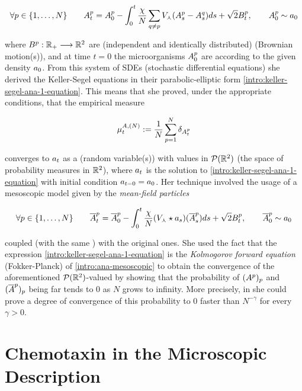 \begin{equation}
		\forall p \in \{1, \ldots, N\}
		\qquad 
		A_t^p = A_0^p - \int_0^t \frac{\chi}{N} \sum_{q\neq p} V_\curlywedge (A_s^p - A_s^q) ds + \sqrt{2} B_t^p,
		\qquad
		A_0^p \sim a_0
\end{equation}

where $B^p: \mathbb{R}_+ \longrightarrow \mathbb{R}^2$ are \iid (independent and identically distributed) \Bm (Brownian motion(s)), and at time $t=0$ the microorganisms $A_0^p$ are \iid according to the given density $a_0$.
From this system of SDEs (stochastic differential equations) she derived the Keller-Segel equations in their parabolic-elliptic form \ref{intro:keller-segel-ana-1-equation}.
This means that she proved, under the appropriate conditions, that the empirical measure

\begin{equation*}
	\mu_t^{A,(N)}:= \frac{1}{N}\sum_{p=1}^N \delta_{A_t^p}
\end{equation*}

converges to $a_t$ as a \rv (random variable(s)) with values in $\mathcal{P}(\mathbb{R}^2)$ (the space of probability measures in $\mathbb{R}^2$), where $a_t$ is the solution to \ref{intro:keller-segel-ana-1-equation} with initial condition $a_{t=0} = a_0$.
Her technique involved the usage of a mesoscopic model given by the \iid \emph{mean-field particles}

\begin{equation}\label{intro:ana-mesoscopic}
	\forall p \in \{1, \ldots, N\}
	\qquad
	\overline{A}_t^p = \overline{A}_0^p - \int_0^t \frac{\chi}{N} (V_\curlywedge \star a_s )(\overline{A}_s^p) ds + \sqrt{2} B_t^p,
	\qquad
	\overline{A}_0^p \sim a_0
\end{equation}

coupled (\ie with the same \Bm) with the original ones.
She used the fact that the expression \ref{intro:keller-segel-ana-1-equation} is the \emph{Kolmogorov forward equation} (Fokker-Planck) of \ref{intro:ana-mesoscopic} to obtain the convergence of the aforementioned $\mathcal{P}(\mathbb{R}^2)$-valued \rv by showing that the probability of $(A^p)_p$ and $(\overline{A}^p)_p$ being far tends to $0$ as $N$ grows to infinity.
More precisely, in \cite[Theorem 2.1]{ana} she could prove a degree of convergence of this probability to $0$ faster than $N^{-\gamma}$ for every $\gamma > 0$.


\section{Chemotaxin in the Microscopic Description}

